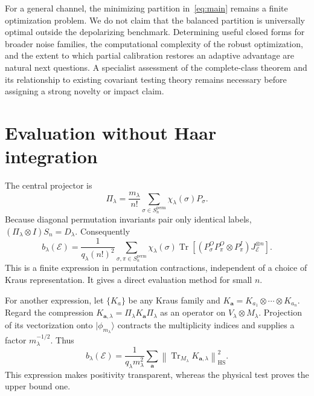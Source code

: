 \documentclass[11pt,a4paper]{article}
\theoremstyle{remark}\newtheorem{remark}[theorem]{Remark}
\DeclareMathOperator{\Tr}{Tr}
\newcommand{\cE}{\mathcal E}
\newcommand{\HS}{\mathrm{HS}}
\newcommand{\ket}[1]{\lvert #1\rangle}
\begin{document}
For a general channel, the minimizing partition in~\eqref{eq:main} remains a finite optimization problem. We do not claim that the balanced partition is universally optimal outside the depolarizing benchmark. Determining useful closed forms for broader noise families, the computational complexity of the robust optimization, and the extent to which partial calibration restores an adaptive advantage are natural next questions. A specialist assessment of the complete-class theorem and its relationship to existing covariant testing theory remains necessary before assigning a strong novelty or impact claim.

\appendix
\section{Evaluation without Haar integration}
The central projector is
\begin{equation}
 \Pi_\lambda=\frac{m_\lambda}{n!}\sum_{\sigma\in S_n^{\mathrm{perm}}}
 \chi_\lambda(\sigma)P_\sigma.
\end{equation}
Because diagonal permutation invariants pair only identical labels,
$(\Pi_\lambda\otimes I)S_n=D_\lambda$. Consequently
\begin{equation}
 b_\lambda(\cE)=\frac1{q_\lambda(n!)^2}
 \sum_{\sigma,\pi\in S_n^{\mathrm{perm}}}\chi_\lambda(\sigma)
 \Tr\!\left[(P_\sigma^OP_\pi^O\otimes P_\pi^I)J_{\cE}^{\otimes n}\right].
\end{equation}
This is a finite expression in permutation contractions, independent of a choice of Kraus representation. It gives a direct evaluation method for small $n$.

For another expression, let $\{K_a\}$ be any Kraus family and $K_{\bm a}=K_{a_1}\otimes\cdots\otimes K_{a_n}$. Regard the compression $K_{\bm a,\lambda}=\Pi_\lambda K_{\bm a}\Pi_\lambda$ as an operator on $V_\lambda\otimes M_\lambda$. Projection of its vectorization onto $\ket{\phi_{m_\lambda}}$ contracts the multiplicity indices and supplies a factor $m_\lambda^{-1/2}$. Thus
\begin{equation}
 b_\lambda(\cE)=\frac1{q_\lambda m_\lambda^2}
 \sum_{\bm a}\left\lVert\Tr_{M_\lambda}K_{\bm a,\lambda}\right\rVert_{\HS}^2.
\end{equation}
This expression makes positivity transparent, whereas the physical test proves the upper bound one.
\end{document}
